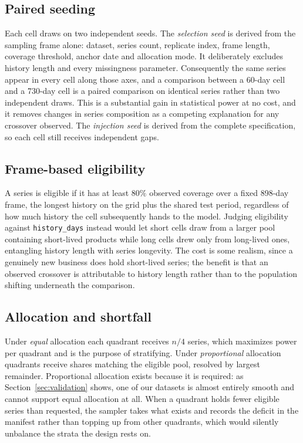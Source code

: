 \documentclass[11pt]{article}
\begin{document}
\subsection{Paired seeding}

Each cell draws on two independent seeds. The \emph{selection seed} is derived
from the sampling frame alone: dataset, series count, replicate index, frame
length, coverage threshold, anchor date and allocation mode. It deliberately
excludes history length and every missingness parameter. Consequently the same
series appear in every cell along those axes, and a comparison between a 60-day
cell and a 730-day cell is a paired comparison on identical series rather than
two independent draws. This is a substantial gain in statistical power at no
cost, and it removes changes in series composition as a competing explanation for
any crossover observed. The \emph{injection seed} is derived from the complete
specification, so each cell still receives independent gaps.

\subsection{Frame-based eligibility}

A series is eligible if it has at least $80\%$ observed coverage over a fixed
898-day frame, the longest history on the grid plus the shared test period, regardless of how much history the cell subsequently hands to the
model. Judging eligibility against \texttt{history\_days} instead would let short
cells draw from a larger pool containing short-lived products while long cells
drew only from long-lived ones, entangling history length with series longevity.
The cost is some realism, since a genuinely new business does hold short-lived
series; the benefit is that an observed crossover is attributable to history
length rather than to the population shifting underneath the comparison.

\subsection{Allocation and shortfall}

Under \emph{equal} allocation each quadrant receives $n/4$ series, which
maximizes power per quadrant and is the purpose of stratifying. Under
\emph{proportional} allocation quadrants receive shares matching the eligible
pool, resolved by largest remainder. Proportional allocation exists because it is
required: as Section~\ref{sec:validation} shows, one of our datasets is almost
entirely smooth and cannot support equal allocation at all. When a quadrant holds
fewer eligible series than requested, the sampler takes what exists and records
the deficit in the manifest rather than topping up from other quadrants, which
would silently unbalance the strata the design rests on.
\end{document}
